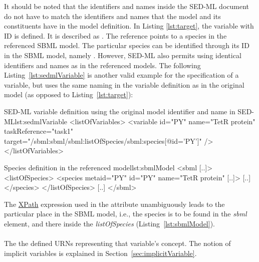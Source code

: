 It should be noted that the identifiers and names inside the SED-ML document do not have to match the identifiers and names that the model and its constituents have in the model definition. In Listing \ref{lst:target}, the variable with ID  is defined. It is described as . The reference points to a species in the referenced SBML model. The particular species can be identified through its ID in the SBML model, namely . However, SED-ML also permits using identical identifiers and names as in the referenced models. The following Listing~\vref{lst:sedmlVariable} is another valid example for the specification of a variable, but uses the same naming in the variable definition as in the original model (as opposed to Listing~\ref{lst:target}):

\begin{myXmlLst}{SED-ML variable definition using the original model identifier and name in SED-ML}{lst:sedmlVariable}
<listOfVariables>
	<variable id="PY" name="TetR protein"  taskReference="task1" 
		target="/sbml:sbml/sbml:listOfSpecies/sbml:species[@id='PY']" />
</listOfVariables>
\end{myXmlLst}

\begin{myXmlLst}{Species definition in the referenced model}{lst:sbmlModel}
<sbml [..]>
	<listOfSpecies>
		<species metaid="PY" id="PY" name="TetR protein" [..]>
		[..]
		</species>
 	</listOfSpecies>
 	[..]
</sbml>
\end{myXmlLst}

The \hyperref[sec:xpath]{XPath} expression used in the  attribute unambiguously leads to the particular place in the SBML model, i.e., the species is to be found in the \emph{sbml} element, and there inside the \emph{listOfSpecies} (Listing~\ref{lst:sbmlModel}). 

\paragraph*{}
\label{sec:symbol}
The   the defined URNs representing that variable's concept. The notion of implicit variables is explained in Section~\ref{sec:implicitVariable}.


